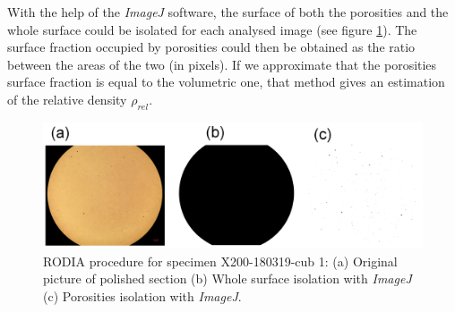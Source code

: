 With the help of the \textit{ImageJ} software, the surface of both the porosities and the whole surface could be isolated for each analysed image (see figure \ref{fig:ImageJ}). The surface fraction occupied by porosities could then be obtained as the ratio between the areas of the two (in pixels). If we approximate that the porosities surface fraction is equal to the volumetric one, that method gives an estimation of the relative density $\rho_{rel}$.

\begin{center}
\begin{table}[ht]
\noindent{}

\caption[Polishing routine for Al-Si alloys]{Polishing routine for Al-Si alloys}
\label{tab:pol}
\end{table}
\end{center}

\begin{figure}[ht]
\centering
\centerline{\includegraphics[scale=0.29]{Images/ImageJ-cub1}}
\decoRule
\caption[RODIA procedure for specimen X200-180319-cub 1: (a) Original picture of polished section (b) Whole surface isolation with \textit{ImageJ} (c) Porosities isolation with \textit{ImageJ}.]{RODIA procedure for specimen X200-180319-cub 1: (a) Original picture of polished section (b) Whole surface isolation with \textit{ImageJ} (c) Porosities isolation with \textit{ImageJ}.}
\label{fig:ImageJ}
\end{figure}


